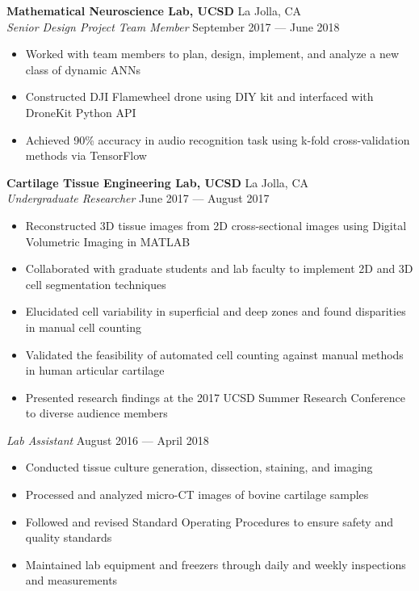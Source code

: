 \documentclass{article}
\newcommand{\lineunder} {
    \vspace*{-8pt} \\
    \hspace*{-18pt} \hrulefill \\
}
\newcommand{\header} [1] {
    {\hspace*{-18pt}\vspace*{6pt} \Large{#1} }
    \vspace*{-6pt} 
    \lineunder
}
\begin{document}
\textbf{Mathematical Neuroscience Lab, UCSD} \hfill La Jolla, CA\\
\textit{Senior Design Project Team Member} \hfill September 2017 --- June 2018\\
\vspace{-2mm}
\begin{itemize} \itemsep 0.05pt
	\item Worked with team members to plan, design, implement, and analyze a new class of dynamic ANNs
	\item Constructed DJI Flamewheel drone using DIY kit and interfaced with DroneKit Python API
	\item Achieved 90\% accuracy in audio recognition task using k-fold cross-validation methods via TensorFlow
	
\end{itemize}

\textbf{Cartilage Tissue Engineering Lab, UCSD} \hfill La Jolla, CA\\
\textit{Undergraduate Researcher} \hfill June 2017 --- August 2017\\
\vspace{-2mm}
\begin{itemize} \itemsep 0.05pt
	\item Reconstructed 3D tissue images from 2D cross-sectional images using Digital Volumetric Imaging in MATLAB
	\item Collaborated with graduate students and lab faculty to implement 2D and 3D cell segmentation techniques
	\item Elucidated cell variability in superficial and deep zones and found disparities in manual cell counting
	\item Validated the feasibility of automated cell counting against manual methods in human articular cartilage
	\item Presented research findings at the 2017 UCSD Summer Research Conference to diverse audience members
\end{itemize}


\textit{Lab Assistant} \hfill August 2016 --- April 2018\\
\vspace{-2mm}
\begin{itemize} \itemsep 0.05pt
	\item Conducted tissue culture generation, dissection, staining, and imaging
	\item Processed and analyzed micro-CT images of bovine cartilage samples
	\item Followed and revised Standard Operating Procedures to ensure safety and quality standards
	\item Maintained lab equipment and freezers through daily and weekly inspections and measurements
\end{itemize}
\end{document}
